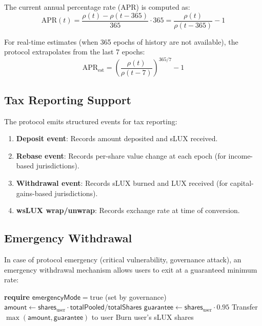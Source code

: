\documentclass[11pt,a4paper]{article}
\begin{document}
The current annual percentage rate (APR) is computed as:
\begin{equation}
    \text{APR}(t) = \frac{\rho(t) - \rho(t - 365)}{365} \cdot 365 = \frac{\rho(t)}{\rho(t-365)} - 1
\end{equation}

For real-time estimates (when 365 epochs of history are not available), the protocol extrapolates from the last 7 epochs:
\begin{equation}
    \text{APR}_{\text{est}} = \left(\frac{\rho(t)}{\rho(t - 7)}\right)^{365/7} - 1
\end{equation}

\subsection{Tax Reporting Support}

The protocol emits structured events for tax reporting:

\begin{enumerate}
    \item \textbf{Deposit event}: Records amount deposited and sLUX received.
    \item \textbf{Rebase event}: Records per-share value change at each epoch (for income-based jurisdictions).
    \item \textbf{Withdrawal event}: Records sLUX burned and LUX received (for capital-gains-based jurisdictions).
    \item \textbf{wsLUX wrap/unwrap}: Records exchange rate at time of conversion.
\end{enumerate}

\subsection{Emergency Withdrawal}

In case of protocol emergency (critical vulnerability, governance attack), an emergency withdrawal mechanism allows users to exit at a guaranteed minimum rate:

\begin{algorithm}[H]
\caption{Emergency Withdrawal}
\label{alg:emergency}
\begin{algorithmic}[1]
    \State \textbf{require} $\mathsf{emergencyMode} = \text{true}$ (set by governance)
    \State $\mathsf{amount} \gets \mathsf{shares}_{\text{user}} \cdot \mathsf{totalPooled} / \mathsf{totalShares}$
    \State $\mathsf{guarantee} \gets \mathsf{shares}_{\text{user}} \cdot 0.95$ 
    \State Transfer $\max(\mathsf{amount}, \mathsf{guarantee})$ to user
    \State Burn user's sLUX shares
\EndProcedure
\end{algorithmic}
\end{algorithm}
\end{document}
